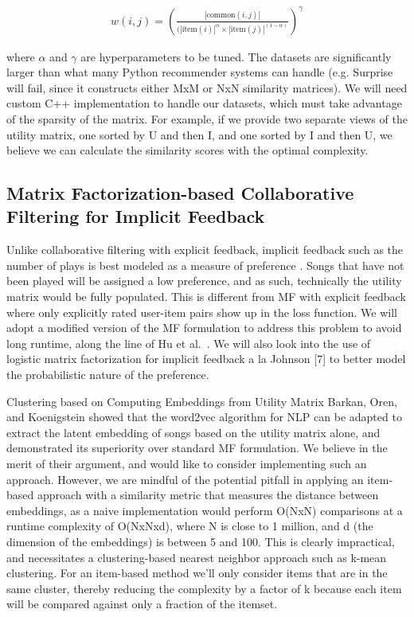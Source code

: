 \documentclass[conference]{IEEEtran}
\begin{document}
\begin{eqnarray*}
w(i, j) = \left(\frac{|\textrm{common}(i, j)|}{(|\textrm{item}(i)|^\alpha \times |\textrm{item}(j)|^{(1-\alpha)}}\right)^\gamma
\end{eqnarray*}

where $\alpha$ and $\gamma$ are hyperparameters to be tuned. The datasets are significantly larger than what many Python recommender systems can handle (e.g. Surprise will fail, since it constructs either MxM or NxN similarity matrices). We will need custom C++ implementation to handle our datasets, which must take advantage of the sparsity of the matrix. For example, if we provide two separate views of the utility matrix, one sorted by U and then I, and one sorted by I and then U, we believe we can calculate the similarity scores with the optimal complexity.

\subsection{Matrix Factorization-based Collaborative Filtering for Implicit Feedback}

Unlike collaborative filtering with explicit feedback, implicit feedback such as the number of plays is best modeled as a measure of preference \cite{hu2008collaborative}. Songs that have not been played will be assigned a low preference, and as such, technically the utility matrix would be fully populated. This is different from MF with explicit feedback where only explicitly rated user-item pairs show up in the loss function. We will adopt a modified version of the MF formulation to address this problem to avoid long runtime, along the line of Hu et al.~\cite{johnson2014logistic}. We will also look into the use of logistic matrix factorization for implicit feedback a la Johnson [7] to better model the probabilistic nature of the preference.

Clustering based on Computing Embeddings from Utility Matrix
Barkan, Oren, and Koenigstein \cite{barkan2016item2vec} showed that the word2vec algorithm for NLP can be adapted to extract the latent embedding of songs based on the utility matrix alone, and demonstrated its superiority over standard MF formulation. We believe in the merit of their argument, and would like to consider implementing such an approach. However, we are mindful of the potential pitfall in applying an item-based approach with a similarity metric that measures the distance between embeddings, as a naive implementation would perform O(NxN) comparisons at a runtime complexity of O(NxNxd), where N is close to 1 million, and d (the dimension of the embeddings) is between 5 and 100. This is clearly impractical, and necessitates a clustering-based nearest neighbor approach such as k-mean clustering. For an item-based method we’ll only consider items that are in the same cluster, thereby reducing the complexity by a factor of k because each item will be compared against only a fraction of the itemset.
\end{document}
